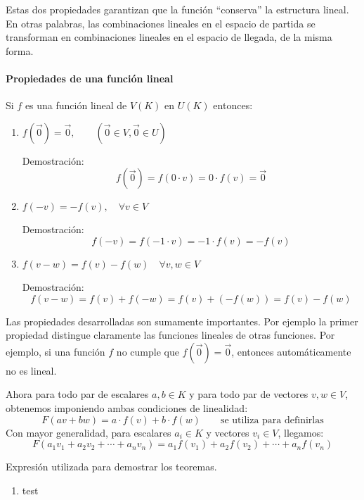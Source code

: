 Estas dos propiedades garantizan que la función ``conserva'' la estructura lineal. En otras palabras, las combinaciones lineales en el espacio de partida se transforman en combinaciones lineales en el espacio de llegada, de la misma forma.

\paragraph{Propiedades de una función lineal}

Si \(f\) es una función lineal de \(V(K)\) en \(U(K)\) entonces:
\begin{enumerate}
  \item \(f\left(\vec{0}\right) = \vec{0}, \qquad \left(\vec{0} \in V,\vec{0} \in U\right)\)

  Demostración:\[
    f\left(\vec{0}\right) = f\left(0 \cdot v\right) = 0 \cdot f(v) = \vec{0}
  \]
  \item \(f(-v)=-f(v), \quad \forall v \in V\)
  
  Demostración: \[
    f(-v) = f(-1 \cdot v) = -1 \cdot f(v) = -f(v)
  \]
  \item \(f(v-w)=f(v) - f(w) \quad \forall v,w \in V\)
  
  Demostración: \[
    f(v-w) = f(v) + f(-w) = f(v) + (-f(w)) = f(v) - f(w)
  \]
\end{enumerate}

\begin{tcolorbox}[interesting_data, title=Nota conceptual]
  Las propiedades desarrolladas son sumamente importantes. Por ejemplo la primer propiedad distingue claramente las funciones lineales de otras funciones. Por ejemplo, si una función \(f\) no cumple que \(f\left(\vec{0}\right) = \vec{0}\), entonces automáticamente no es lineal.
\end{tcolorbox}

Ahora para todo par de escalares \(a,b \in K\) y para todo par de vectores \(v,w \in V\), obtenemos imponiendo ambas condiciones de linealidad:
\[
  F(av + bw) = a\cdot f(v) + b\cdot f(w) \qquad \text{se utiliza para definirlas}
\]
Con mayor generalidad, para escalares \(a_i \in K\) y vectores \(v_i \in V\), llegamos:
\[
  F(a_1 v_1 + a_2 v_2 + \cdots + a_n v_n) = a_1 f(v_1) + a_2 f(v_2) + \cdots + a_n f(v_n)
\]
\begin{tcolorbox}[myconclusion]
  Expresión utilizada para demostrar los teoremas.
\end{tcolorbox}

\begin{enumerate}[label=\alph*.]
  \item test
\end{enumerate}
